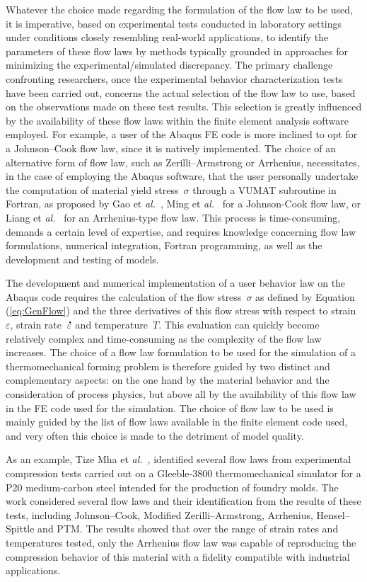 \documentclass[algorithms,article,submit,pdftex,oneauthors]{Definitions/mdpi}
\makeatletter
\DeclareRobustCommand{\mdot}[1]{\accentset{\mbox{\bfseries .}}{#1}}
\DeclareRobustCommand{\eal}{et \emph{al.}\@\xspace}
\makeatother
\begin{document}
Whatever the choice made regarding the formulation of the flow law to be used, it is imperative, based on experimental tests conducted in laboratory settings under conditions closely resembling real-world applications, to identify the parameters of these flow laws by methods typically grounded in approaches for minimizing the experimental/simulated discrepancy.
The primary challenge confronting researchers, once the experimental behavior characterization tests have been carried out, concerns the actual selection of the flow law to use, based on the observations made on these test results.
This selection is greatly influenced by the availability of these flow laws within the finite element analysis software employed.
For example, a user of the Abaqus FE code is more inclined to opt for a Johnson--Cook flow law, since it is natively implemented.
The choice of an alternative form of flow law, such as Zerilli--Armstrong or Arrhenius, necessitates, in the case of employing the Abaqus software, that the user personally undertake the computation of material yield stress~$\sigma$ through a VUMAT subroutine in Fortran, as proposed by Gao \eal~\cite{Gao-2007-FRT}, Ming \eal~\cite{Ming-2018-ERV} for a Johnson-Cook flow law, or Liang \eal~\cite{Liang-2022} for an Arrhenius-type flow law.
This process is time-consuming, demands a certain level of expertise, and requires knowledge concerning flow law formulations, numerical integration, Fortran programming, as well as the development and testing of models.

The development and numerical implementation of a user behavior law on the Abaqus code requires the calculation of the flow stress~$\sigma$ as defined by Equation (\ref{eq:GenFlow}) and the three derivatives of this flow stress with respect to strain~$\varepsilon$, strain rate~$\mdot{\varepsilon}$ and temperature~$T$.
This evaluation can quickly become relatively complex and time-consuming as the complexity of the flow law increases.
The choice of a flow law formulation to be used for the simulation of a thermomechanical forming problem is therefore guided by two distinct and complementary aspects: on the one hand by the material behavior and the consideration of process physics, but above all by the availability of this flow law in the FE code used for the simulation.
The choice of flow law to be used is mainly guided by the list of flow laws available in the finite element code used, and very often this choice is made to the detriment of model quality.

As an example, Tize Mha \eal~\cite{Tize-2023-IEP}, identified several flow laws from experimental compression tests carried out on a Gleeble-3800 thermomechanical simulator for a P20 medium-carbon steel intended for the production of foundry molds.
The work considered several flow laws and their identification from the results of these tests, including Johnson--Cook, Modified Zerilli--Armstrong, Arrhenius, Hensel--Spittle and PTM.
The results showed that over the range of strain rates and temperatures tested, only the Arrhenius flow law was capable of reproducing the compression behavior of this material with a fidelity compatible with industrial applications.
\end{document}
